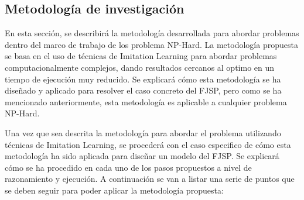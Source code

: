 \subsection{Metodología de investigación}
En esta sección, se describirá la metodología desarrollada para abordar problemas 
dentro del marco de trabajo de los problema NP-Hard. La metodología propuesta se 
basa en el uso de técnicas de Imitation Learning para abordar problemas computacionalmente
complejos, dando resultados cercanos al optimo en un tiempo de ejecución muy reducido. 
Se explicará cómo esta metodología se ha diseñado y aplicado para resolver el caso concreto 
del FJSP, pero como se ha mencionado anteriormente, esta metodología es aplicable a cualquier
problema NP-Hard.\medskip

Una vez que sea descrita la metodología para abordar el problema utilizando 
técnicas de Imitation Learning, se procederá con el caso especifico de cómo esta metodología 
ha sido aplicada para diseñar un modelo del FJSP. Se explicará cómo se ha procedido en cada uno 
de los pasos propuestos a nivel de razonamiento y ejecución. A continuación se van a listar una 
serie de puntos que se deben seguir para poder aplicar la metodología propuesta:


